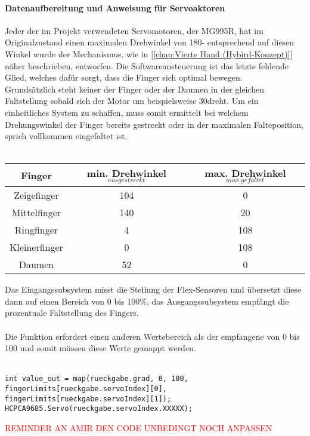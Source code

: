 \documentclass[titlepage,12pt,twoside]{article}
\begin{document}
\paragraph{Datenaufbereitung und Anweisung für Servoaktoren}
\label{par:Datenaufbereitung und Anweisung für Servoaktoren}
\hfill \break
\hfill \break
Jeder der im Projekt verwendeten Servomotoren, der MG995R, hat im Originalzustand einen maximalen Drehwinkel von 180\textdegree - entsprechend auf diesen 
Winkel wurde der Mechanismus, wie in [\textcolor{blue}{\autoref{chap:Vierte Hand (Hybird-Konzept)}}] näher beschrieben, entworfen. Die Softwareansteuerung ist das letzte 
fehlende Glied, welches dafür sorgt, dass die Finger sich optimal bewegen. \\
Grundsätzlich steht keiner der Finger oder der Daumen in der gleichen Faltstellung sobald sich der Motor um beispielsweise 30\textdegree dreht. Um ein einheitliches 
System zu schaffen, muss somit ermittelt bei welchem Drehungswinkel der Finger bereits gestreckt oder in der maximalen Falteposition, sprich vollkommen 
eingefaltet ist. \\
\\
\begin{table}[H]
    \centering
    \begin{tabular}{|c|c|c|}  %
        \hline
        \textbf{Finger} & \textbf{min. Drehwinkel$_{ausgestreckt}$} & \textbf{max. Drehwinkel$_{max. gefaltet}$} \\
        \hline
		Zeigefinger & 104\textdegree & 0\textdegree \\
		\hline
		Mittelfinger & 140\textdegree & 20\textdegree \\
		\hline
		Ringfinger & 4\textdegree & 108\textdegree \\
		\hline
		Kleinerfinger & 0\textdegree & 108\textdegree \\
		\hline
		Daumen & 52\textdegree & 0\textdegree \\
		\hline
    \end{tabular}
    \label{tab:Servo Drehwinkel}
\end{table}
\hfill \break
Das Eingangssubsystem misst die Stellung der Flex-Sensoren und übersetzt diese dann auf einen Bereich von 0 bis 100\%, das Ausgangssubsystem empfängt 
die prozentuale Faltstellung des Fingers. \\
\\
Die Funktion  erfordert einen anderen Wertebereich als der empfangene von 0 bis 100 und somit müssen diese Werte gemappt werden. \\
\\
\footnotesize
\begin{lstlisting}
int value_out = map(rueckgabe.grad, 0, 100, fingerLimits[rueckgabe.servoIndex][0], 
fingerLimits[rueckgabe.servoIndex][1]);
HCPCA9685.Servo(rueckgabe.servoIndex.XXXXX);
\end{lstlisting}
\hfill \break
\normalsize
\textcolor{red}{REMINDER AN AMIR DEN CODE UNBEDINGT NOCH ANPASSEN} \\
\\
\end{document}
